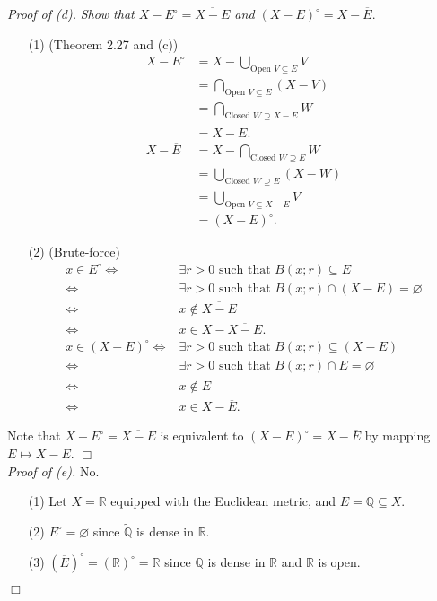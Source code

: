 \documentclass{article}
\begin{document}
\emph{Proof of (d).}
\emph{Show that
$X - E^{\circ} = \overline{X - E}$ and
$(X-E)^{\circ} = X - \overline{E}.$}
\begin{enumerate}
\item[(1)]
(Theorem 2.27 and (c))
\begin{align*}
X - E^{\circ}
&= X - \bigcup_{\text{Open } V \subseteq E} V \\
&= \bigcap_{\text{Open } V \subseteq E} (X - V) \\
&= \bigcap_{\text{Closed } W \supseteq X-E} W \\
&= \overline{X - E}. \\
X - \overline{E}
&= X - \bigcap_{\text{Closed } W \supseteq E} W \\
&= \bigcup_{\text{Closed } W \supseteq E} (X - W) \\
&= \bigcup_{\text{Open } V \subseteq X-E} V \\
&= (X - E)^{\circ}.
\end{align*}
\item[(2)]
(Brute-force)
\begin{align*}
x \in E^{\circ}
\Longleftrightarrow&
\exists r > 0 \text{ such that } B(x;r) \subseteq E \\
\Longleftrightarrow&
\exists r > 0 \text{ such that } B(x;r) \cap (X-E) = \varnothing \\
\Longleftrightarrow&
x \not\in \overline{X-E} \\
\Longleftrightarrow&
x \in X - \overline{X-E}. \\
x \in (X-E)^{\circ}
\Longleftrightarrow&
\exists r > 0 \text{ such that } B(x;r) \subseteq (X-E) \\
\Longleftrightarrow&
\exists r > 0 \text{ such that } B(x;r) \cap E = \varnothing \\
\Longleftrightarrow&
x \not\in \overline{E} \\
\Longleftrightarrow&
x \in X - \overline{E}.
\end{align*}
\end{enumerate}
Note that $X - E^{\circ} = \overline{X - E}$ is equivalent to
$(X-E)^{\circ} = X - \overline{E}$ by mapping $E \mapsto X-E$.
$\Box$ \\

\emph{Proof of (e).}
No.
\begin{enumerate}
\item[(1)]
Let $X = \mathbb{R}$ equipped with the Euclidean metric, and $E = \mathbb{Q} \subseteq X$.
\item[(2)]
$E^\circ = \varnothing$ since $\widetilde{\mathbb{Q}}$ is dense in $\mathbb{R}$.
\item[(3)]
$(\overline{E})^{\circ} = (\mathbb{R})^{\circ} = \mathbb{R}$
since $\mathbb{Q}$ is dense in $\mathbb{R}$ and $\mathbb{R}$ is open.
\end{enumerate}
$\Box$ \\
\end{document}
